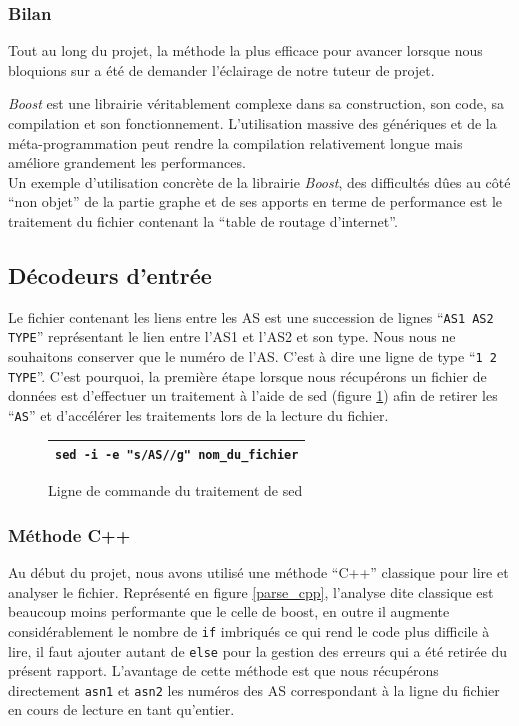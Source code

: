 \subsubsection{Bilan}

Tout au long du projet, la méthode la plus efficace pour avancer lorsque nous bloquions sur \boost a été de demander l'éclairage de notre tuteur de projet. 

\textit{Boost} est une librairie véritablement complexe dans sa construction, son code, sa compilation et son fonctionnement. L'utilisation massive des génériques et de la méta-programmation peut rendre la compilation relativement longue mais améliore grandement les performances.
~\\
Un exemple d'utilisation  concrète de la librairie \textit{Boost}, des difficultés dûes au côté ``non objet'' de la partie graphe et de ses apports en terme de performance est le traitement du fichier contenant la ``table de routage d'internet''.

\subsection{Décodeurs d'entrée}
Le fichier contenant les liens entre les AS est une succession de lignes ``\verb|AS1 AS2 TYPE|'' représentant le lien entre l'AS1 et l'AS2 et son type. Nous nous ne souhaitons conserver que le numéro de l'AS. C'est à dire une ligne de type ``\verb|1 2 TYPE|''. C'est pourquoi, la première étape lorsque nous récupérons un fichier de données est d'effectuer un traitement à l'aide de sed (figure \ref{sed}) afin de retirer les ``\verb|AS|'' et d'accélérer les traitements lors de la lecture du fichier. 
\begin{figure}[H]
   \begin{center}
      \begin{tabular}{l}
         \hline
         \verb|sed -i -e "s/AS//g" nom_du_fichier|\\
         \hline
      \end{tabular}
   \end{center}
\caption{\label{sed} Ligne de commande du traitement de sed}
\end{figure}

\subsubsection{Méthode C++}

Au début du projet, nous avons utilisé une méthode ``C++'' classique pour lire et analyser le fichier. 
Représenté en figure \ref{parse_cpp}, l'analyse dite classique est beaucoup moins performante que le celle de boost, en outre il augmente considérablement le nombre de \verb|if| imbriqués ce qui rend le code plus difficile à lire, il faut ajouter autant de \verb|else| pour la gestion des erreurs qui a été retirée du présent rapport. L'avantage de cette méthode est que nous récupérons directement \verb|asn1| et \verb|asn2| les numéros des AS correspondant à la ligne du fichier en cours de lecture en tant qu'entier.

